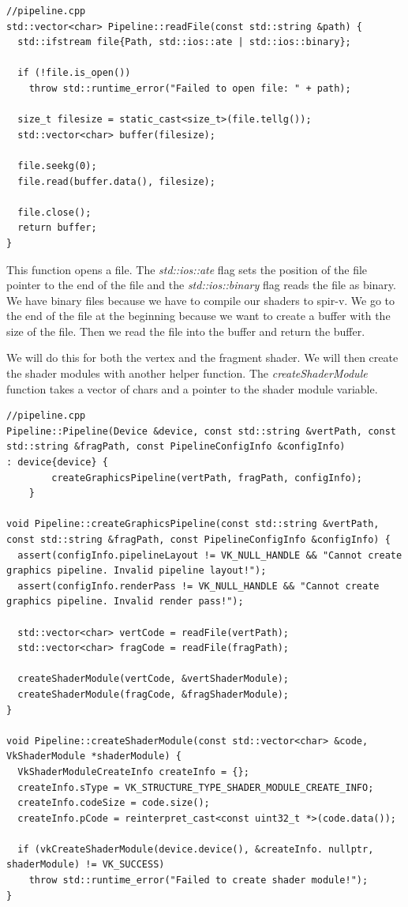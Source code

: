 \documentclass[12pt]{report} \usepackage{preamble}
\begin{document}
\begin{lstlisting}[Language=C++]
//pipeline.cpp
std::vector<char> Pipeline::readFile(const std::string &path) {
  std::ifstream file{Path, std::ios::ate | std::ios::binary};

  if (!file.is_open())
    throw std::runtime_error("Failed to open file: " + path);

  size_t filesize = static_cast<size_t>(file.tellg());
  std::vector<char> buffer(filesize);

  file.seekg(0);
  file.read(buffer.data(), filesize);

  file.close();
  return buffer;
}
\end{lstlisting}

This function opens a file. The \textit{std::ios::ate} flag sets the position of the file pointer to the end of the file and the
\textit{std::ios::binary} flag reads the file as binary. We have binary files because we have to compile our shaders to spir-v.
We go to the end of the file at the beginning because we want to create a buffer with the size of the file. Then we read the
file into the buffer and return the buffer.

We will do this for both the vertex and the fragment shader. We will then create the shader modules with another helper function.
The \textit{createShaderModule} function takes a vector of chars and a pointer to the shader module variable.

\begin{lstlisting}[Language=C++]
//pipeline.cpp
Pipeline::Pipeline(Device &device, const std::string &vertPath, const std::string &fragPath, const PipelineConfigInfo &configInfo)
: device{device} {
		createGraphicsPipeline(vertPath, fragPath, configInfo);
	}

void Pipeline::createGraphicsPipeline(const std::string &vertPath, const std::string &fragPath, const PipelineConfigInfo &configInfo) {
  assert(configInfo.pipelineLayout != VK_NULL_HANDLE && "Cannot create graphics pipeline. Invalid pipeline layout!");
  assert(configInfo.renderPass != VK_NULL_HANDLE && "Cannot create graphics pipeline. Invalid render pass!");

  std::vector<char> vertCode = readFile(vertPath);
  std::vector<char> fragCode = readFile(fragPath);

  createShaderModule(vertCode, &vertShaderModule);
  createShaderModule(fragCode, &fragShaderModule);
}

void Pipeline::createShaderModule(const std::vector<char> &code, VkShaderModule *shaderModule) {
  VkShaderModuleCreateInfo createInfo = {};
  createInfo.sType = VK_STRUCTURE_TYPE_SHADER_MODULE_CREATE_INFO;
  createInfo.codeSize = code.size();
  createInfo.pCode = reinterpret_cast<const uint32_t *>(code.data());

  if (vkCreateShaderModule(device.device(), &createInfo. nullptr, shaderModule) != VK_SUCCESS)
    throw std::runtime_error("Failed to create shader module!");
}
\end{lstlisting}
\end{document}
